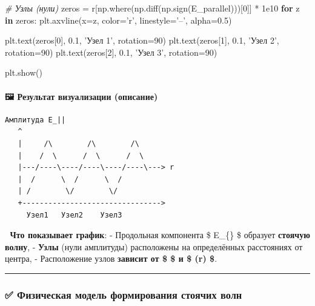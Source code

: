 \documentclass[11pt]{article}
\newenvironment{Shaded}{}{}
\newcommand{\KeywordTok}[1]{\textcolor[rgb]{0.00,0.44,0.13}{\textbf{{#1}}}}
\newcommand{\DecValTok}[1]{\textcolor[rgb]{0.25,0.63,0.44}{{#1}}}
\newcommand{\FloatTok}[1]{\textcolor[rgb]{0.25,0.63,0.44}{{#1}}}
\newcommand{\StringTok}[1]{\textcolor[rgb]{0.25,0.44,0.63}{{#1}}}
\newcommand{\CommentTok}[1]{\textcolor[rgb]{0.38,0.63,0.69}{\textit{{#1}}}}
\newcommand{\NormalTok}[1]{{#1}}
\newcommand{\ControlFlowTok}[1]{\textcolor[rgb]{0.00,0.44,0.13}{\textbf{{#1}}}}
\newcommand{\OperatorTok}[1]{\textcolor[rgb]{0.40,0.40,0.40}{{#1}}}
\begin{document}
\begin{Shaded}
\begin{Highlighting}[]
\CommentTok{# Узлы (нули)}
\NormalTok{zeros }\OperatorTok{=}\NormalTok{ r[np.where(np.diff(np.sign(E_parallel)))[}\DecValTok{0}\NormalTok{]] }\OperatorTok{*} \FloatTok{1e10}
\ControlFlowTok{for}\NormalTok{ z }\KeywordTok{in}\NormalTok{ zeros:}
\NormalTok{    plt.axvline(x}\OperatorTok{=}\NormalTok{z, color}\OperatorTok{=}\StringTok{'r'}\NormalTok{, linestyle}\OperatorTok{=}\StringTok{'--'}\NormalTok{, alpha}\OperatorTok{=}\FloatTok{0.5}\NormalTok{)}

\NormalTok{plt.text(zeros[}\DecValTok{0}\NormalTok{], }\FloatTok{0.1}\NormalTok{, }\StringTok{'Узел 1'}\NormalTok{, rotation}\OperatorTok{=}\DecValTok{90}\NormalTok{)}
\NormalTok{plt.text(zeros[}\DecValTok{1}\NormalTok{], }\FloatTok{0.1}\NormalTok{, }\StringTok{'Узел 2'}\NormalTok{, rotation}\OperatorTok{=}\DecValTok{90}\NormalTok{)}
\NormalTok{plt.text(zeros[}\DecValTok{2}\NormalTok{], }\FloatTok{0.1}\NormalTok{, }\StringTok{'Узел 3'}\NormalTok{, rotation}\OperatorTok{=}\DecValTok{90}\NormalTok{)}

\NormalTok{plt.show()}
\end{Highlighting}
\end{Shaded}

\paragraph{🖼️ Результат визуализации
(описание)}\label{ux440ux435ux437ux443ux43bux44cux442ux430ux442-ux432ux438ux437ux443ux430ux43bux438ux437ux430ux446ux438ux438-ux43eux43fux438ux441ux430ux43dux438ux435}

\begin{verbatim}
Амплитуда E_||
   ^
   |     /\        /\        /\
   |    /  \      /  \      /  \
   |---/----\----/----\----/----\---> r
   |  /      \  /      \  /
   | /        \/        \/
   +-------------------------------->
     Узел1   Узел2    Узел3
\end{verbatim}

📌 \textbf{Что показывает график}: - Продольная компонента \$
E\_\{\parallel\} \$ образует \textbf{стоячую волну}, - \textbf{Узлы}
(нули амплитуды) расположены на определённых расстояниях от центра, -
Расположение узлов \textbf{зависит от \$ \omega \$ и \$ \mathcal{G}(r)
\$}.

\begin{center}\rule{0.5\linewidth}{\linethickness}\end{center}

\subsubsection{✅ Физическая модель формирования стоячих
волн}\label{ux444ux438ux437ux438ux447ux435ux441ux43aux430ux44f-ux43cux43eux434ux435ux43bux44c-ux444ux43eux440ux43cux438ux440ux43eux432ux430ux43dux438ux44f-ux441ux442ux43eux44fux447ux438ux445-ux432ux43eux43bux43d}
\end{document}
